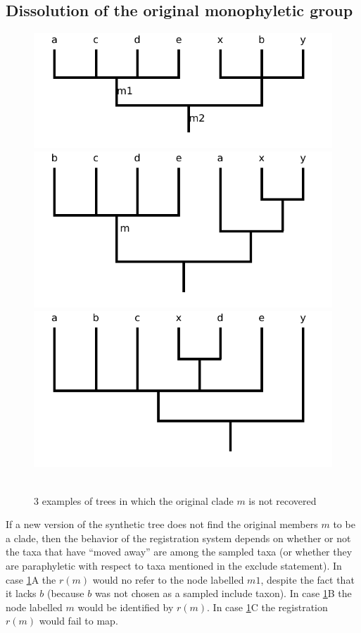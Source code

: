 \documentclass[11pt]{article}
\begin{document}
\subsection{Dissolution of the original monophyletic group}
\begin{figure}[h]
   \centering  \includegraphics[scale=.5]{images/jar-false-positive.pdf}
   \includegraphics[scale=.5]{images/jar-relocation.pdf}
   \includegraphics[scale=.5]{images/jar-no-resolution.pdf}\\
   \\
   \caption{3 examples of trees in which the original clade $m$ is not recovered}\label{jarDissolutionOfM}
\end{figure}
If a new version of the synthetic tree does not find the original members
  $m$ to be a clade, then the behavior of the registration system depends on
  whether or not the taxa that have ``moved away'' are among the sampled taxa
  (or whether they are paraphyletic with respect to taxa mentioned in the 
  exclude statement).
In case \ref{jarDissolutionOfM}A the $r(m)$ would no refer to the node labelled $m1$,
  despite the fact that it lacks $b$ (because $b$ was not chosen as a sampled include taxon).
In case \ref{jarDissolutionOfM}B the node labelled $m$ would be identified by $r(m)$.
In case \ref{jarDissolutionOfM}C the registration $r(m)$ would fail to map.
\end{document}

